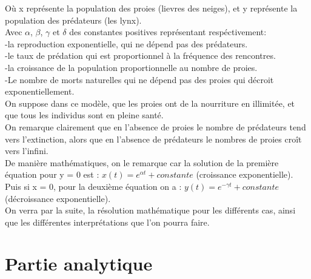 \documentclass[a4paper,16pt,twoside]{report}
\begin{document}
Où x représente la population des proies (lievres des neiges), et y représente la population des prédateurs (les lynx).\\




Avec $\alpha$, $\beta$, $\gamma$ et $\delta$ des constantes positives représentant respéctivement:\\
    -la reproduction exponentielle, qui ne dépend pas des prédateurs.\\
    -le taux de prédation qui est proportionnel à la fréquence des rencontres.\\
    -la croissance de la population proportionnelle au nombre de proies.\\
    -Le nombre de morts naturelles qui ne dépend pas des proies qui décroit exponentiellement.\\
    
    
    On suppose dans ce modèle, que les proies ont de la nourriture en illimitée, et que tous les individus sont en pleine santé.\\
    On remarque clairement que en l'absence de proies le nombre de prédateurs tend vers l'extinction, alors que en l'absence de prédateurs le nombres de proies croît vers l'infini.\\
    
    
    
    De manière mathématiques, on le remarque car la solution de la première équation pour y = 0 est : $x(t)=e^{\alpha t}+constante$ (croissance exponentielle).\\ Puis si x = 0, pour la deuxième équation on a : $y(t)=e^{- \gamma t}+ constante$ (décroissance exponentielle).\\
    
    
    
    On verra par la suite, la résolution mathématique pour les différents cas, ainsi que les différentes interprétations que l'on pourra faire.\\
    
    \chapter{Partie analytique}
    
\end{document}

